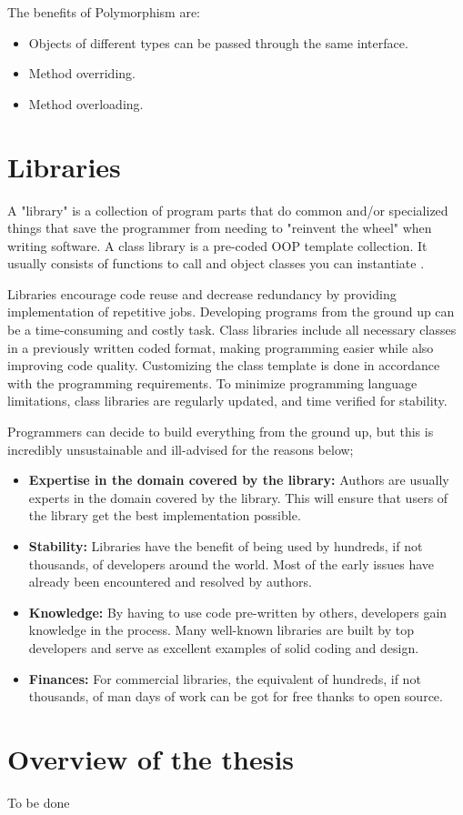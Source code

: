 The benefits of Polymorphism are:

\begin{itemize}
  \item Objects of different types can be passed through the same interface.
  \item Method overriding.
  \item Method overloading.
\end{itemize}

\section{Libraries}
A "library" is a collection of program parts that do common and/or specialized things that save the programmer from needing to "reinvent the wheel" when writing software. A class library is a pre-coded OOP template collection. It usually consists of functions to call and object classes you can instantiate \cite{stevenparker}.

Libraries encourage code reuse and decrease redundancy by providing implementation of repetitive jobs.  Developing programs from the ground up can be a time-consuming and costly task. Class libraries include all necessary classes in a previously written coded format, making programming easier while also improving code quality. Customizing the class template is done in accordance with the programming requirements. To minimize programming language limitations, class libraries are regularly updated, and time verified for stability.

Programmers can decide to build everything from the ground up, but this is incredibly unsustainable and ill-advised for the reasons below;

\begin{itemize}
  \item \textbf{Expertise in the domain covered by the library:} Authors are usually experts in the domain covered by the library. This will ensure that users of the library get the best implementation possible.
  \item \textbf{Stability:} Libraries have the benefit of being used by hundreds, if not thousands, of developers around the world. Most of the early issues have already been encountered and resolved by authors.
  \item \textbf{Knowledge:} By having to use code pre-written by others, developers gain knowledge in the process. Many well-known libraries are built by top developers and serve as excellent examples of solid coding and design.
  \item \textbf{Finances:} For commercial libraries, the equivalent of hundreds, if not thousands, of man days of work can be got for free thanks to open source.
\end{itemize}

\section{Overview of the thesis}
To be done